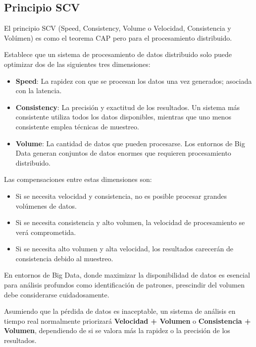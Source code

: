 \newpage

\subsection{Principio SCV}

El principio SCV (Speed, Consistency, Volume o Velocidad, Consistencia y Volúmen) es como el teorema CAP pero para el procesamiento distribuido. 

Establece que un sistema de procesamiento de datos distribuido solo puede optimizar dos de las siguientes tres dimensiones:

\begin{itemize}
    \item \textbf{Speed}: La rapidez con que se procesan los datos una vez generados; asociada con la latencia.
    \item \textbf{Consistency}: La precisión y exactitud de los resultados. Un sistema más consistente utiliza todos los datos disponibles, mientras que uno menos consistente emplea técnicas de muestreo.
    \item \textbf{Volume}: La cantidad de datos que pueden procesarse. Los entornos de Big Data generan conjuntos de datos enormes que requieren procesamiento distribuido.
\end{itemize}

Las compensaciones entre estas dimensiones son:

\begin{itemize}
    \item Si se necesita velocidad y consistencia, no es posible procesar grandes volúmenes de datos.
    \item Si se necesita consistencia y alto volumen, la velocidad de procesamiento se verá comprometida.
    \item Si se necesita alto volumen y alta velocidad, los resultados carecerán de consistencia debido al muestreo.
\end{itemize}

En entornos de Big Data, donde maximizar la disponibilidad de datos es esencial para análisis profundos como identificación de patrones, 
prescindir del volumen debe considerarse cuidadosamente. \newline

Asumiendo que la pérdida de datos es inaceptable, un sistema de análisis en tiempo real normalmente priorizará \textbf{Velocidad + Volumen} o \textbf{Consistencia + Volumen}, 
dependiendo de si se valora más la rapidez o la precisión de los resultados. \parencite{scv}


